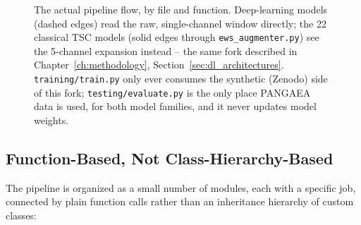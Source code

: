 \begin{figure}[htbp]
\caption{The actual pipeline flow, by file and function. Deep-learning models (dashed edges) read the raw, single-channel window directly; the 22 classical TSC models (solid edges through \texttt{ews\_augmenter.py}) see the 5-channel expansion instead -- the same fork described in Chapter~\ref{ch:methodology}, Section~\ref{sec:dl_architectures}. \texttt{training/train.py} only ever consumes the synthetic (Zenodo) side of this fork; \texttt{testing/evaluate.py} is the only place PANGAEA data is used, for both model families, and it never updates model weights.}
\label{fig:pipeline_flow}
\end{figure}

\subsection{Function-Based, Not Class-Hierarchy-Based}

The pipeline is organized as a small number of modules, each with a specific job, connected by plain function calls rather than an inheritance hierarchy of custom classes:

